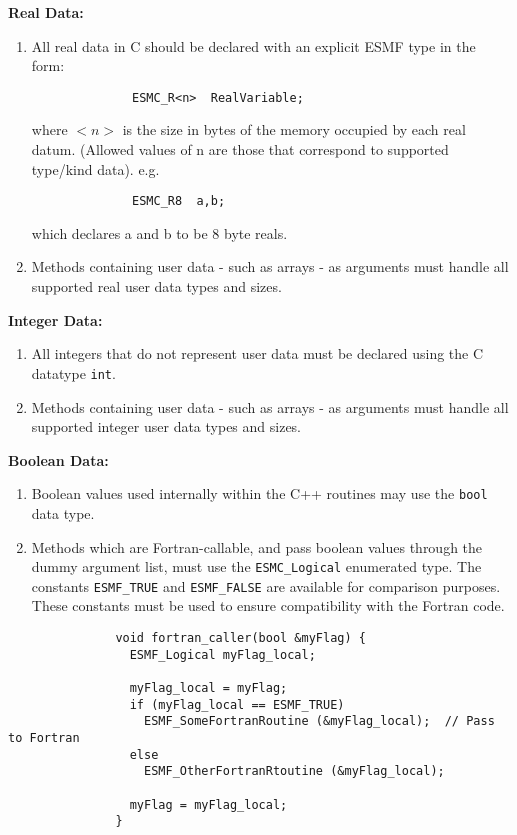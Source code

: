 {\bf Real Data:}
\begin{enumerate}
\item All real data in C should be declared with an explicit ESMF type in the form:
\begin{verbatim}
              ESMC_R<n>  RealVariable;
\end{verbatim}
      where $<n>$ is the size in bytes of the memory occupied by each real datum. (Allowed values of n are those that correspond to supported type/kind data). e.g.
\begin{verbatim}
              ESMC_R8  a,b;
\end{verbatim}
      which declares a and b to be 8 byte reals.

\item Methods containing user data - such as arrays - as arguments must handle all supported real user data types and sizes.
\end{enumerate}

{\bf Integer Data:}
\begin{enumerate}
\item All integers that do not represent user data must be declared using the C datatype {\tt int}.

\item Methods containing user data - such as arrays - as arguments must handle all supported integer user data types and sizes.
\end{enumerate}

{\bf Boolean Data:}
\begin{enumerate}
\item Boolean values used internally within the C++ routines may use the {\tt bool} data type.

\item Methods which are Fortran-callable, and pass boolean values through the dummy argument list, must use the
{\tt ESMC\_Logical} enumerated type.  The constants {\tt ESMF\_TRUE} and {\tt ESMF\_FALSE} are available
for comparison purposes.  These constants must be used to ensure compatibility with the Fortran code.
\end{enumerate}

\begin{verbatim}
               void fortran_caller(bool &myFlag) {	       
                 ESMF_Logical myFlag_local;

                 myFlag_local = myFlag;
                 if (myFlag_local == ESMF_TRUE)
                   ESMF_SomeFortranRoutine (&myFlag_local);  // Pass to Fortran
                 else
                   ESMF_OtherFortranRtoutine (&myFlag_local);

                 myFlag = myFlag_local;
               }
\end{verbatim}

